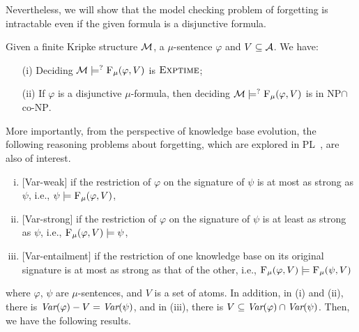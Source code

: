 \documentclass[runningheads]{llncs}
\begin{document}
Nevertheless, we will show that the model checking problem of forgetting is intractable even if the given formula is a disjunctive formula.

\begin{proposition}\label{pro:MC}
Given a finite Kripke structure  ${\cal M}$, a $\mu$-sentence $\varphi$ and $V\subseteq {\cal A}$. We have:
\begin{itemize}
  \item[(i)] Deciding ${\cal M} \models^? {\textsc{F}_{\textsc{$\mu$}}}(\varphi, V)$ is $\textsc{Exptime}$;
  \item[(ii)] If $\varphi$ is a disjunctive $\mu$-formula, then deciding ${\cal M} \models^? {\textsc{F}_{\textsc{$\mu$}}}(\varphi, V)$ is in \textsc{NP}$\cap$co-\textsc{NP}.
\end{itemize}
\end{proposition}

More importantly, from the perspective of knowledge base evolution,
the following reasoning problems about forgetting, which are explored in PL~\cite{wang2015forgetting}, are also of interest.

\begin{enumerate}[(i)]
    \item $[$Var-weak$]$ if the restriction of $\varphi$ on the signature of $\psi$ is at most as strong as $\psi$, i.e., $\psi\models {\textsc{F}_{\textsc{$\mu$}}}(\varphi, V)$,
    \item $[$Var-strong$]$ if the restriction of $\varphi$ on the signature of $\psi$ is at least as strong as $\psi$, i.e., ${\textsc{F}_{\textsc{$\mu$}}}(\varphi, V)\models \psi$,
    \item $[$Var-entailment$]$ if the restriction of one knowledge base on its original signature is at most as strong as that of the other, i.e., ${\textsc{F}_{\textsc{$\mu$}}}(\varphi, V) \models {\textsc{F}_{\textsc{$\mu$}}}(\psi, V)$
\end{enumerate}
where $\varphi$, $\psi$ are $\mu$-sentences, and $V$ is a set of atoms. In addition, in (i) and (ii), there is $\textit{Var}(\varphi) - V = \textit{Var}(\psi)$, and in (iii), there is $V \subseteq \textit{Var}(\varphi) \cap \textit{Var}(\psi)$. Then, we have the following results.
\end{document}
